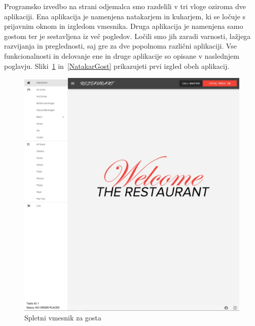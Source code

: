 \documentclass[a4paper, 12pt]{book}
\begin{document}
Programsko izvedbo na strani odjemalca smo razdelili v tri vloge oziroma dve aplikaciji. Ena aplikacija je namenjena natakarjem in kuharjem, ki se ločuje s prijavnim oknom in izgledom vmesnika. Druga aplikacija je namenjena samo gostom ter je sestavljena iz več pogledov. Ločili smo jih zaradi varnosti, lažjega razvijanja in preglednosti, saj gre za dve popolnoma različni aplikaciji. Vse funkcionalnosti in delovanje ene in druge aplikacije so opisane v naslednjem poglavju. Sliki~\ref{Gost} in~\ref{NatakarGost} prikazujeti prvi izgled obeh aplikacij.

\begin{figure}[!htb]
\begin{center}
\includegraphics[width=12.5cm]{gost_1.jpg}
\caption{Spletni vmesnik za gosta}
\label{Gost}
\end{center}
\end{figure}
\end{document}

